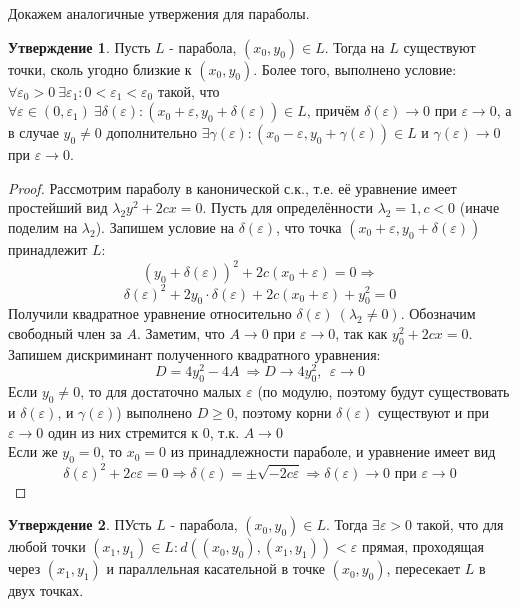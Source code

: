 \documentclass[a4paper, 12pt]{article}
\renewcommand{\epsilon}{\varepsilon}
\theoremstyle{definition}
\newtheorem*{subtheorem}{Утверждение}
\begin{document}
	Докажем аналогичные утвержения для параболы.
	\begin{subtheorem}
		Пусть $L$ - парабола, $(x_0, y_0) \in L$. Тогда на $L$ существуют точки, сколь угодно близкие к $(x_0, y_0)$. Более того, выполнено условие:\\
		$\forall \epsilon_0 > 0 \ \exists \epsilon_1: 0 < \epsilon_1 < \epsilon_0$ такой, что $\forall \epsilon \in (0, \epsilon_1) \ \exists \delta(\epsilon): (x_0 + \epsilon, y_0 + \delta(\epsilon)) \in L$, причём $\delta(\epsilon) \rightarrow 0$ при $\epsilon \rightarrow 0$, а в случае $y_0 \neq 0$ дополнительно $\exists \gamma(\epsilon): (x_0 - \epsilon, y_0 + \gamma(\epsilon)) \in L$ и $\gamma(\epsilon) \rightarrow 0$ при $\epsilon \rightarrow 0$.
	\end{subtheorem}
	\begin{proof}
		Рассмотрим параболу в канонической с.к., т.е. её уравнение имеет простейший вид $\lambda_2y^2+2cx = 0$. Пусть для определённости $\lambda_2 = 1, c < 0$ (иначе поделим на $\lambda_2$). Запишем условие на $\delta(\epsilon)$, что точка $(x_0 + \epsilon, y_0 + \delta(\epsilon))$ принадлежит $L$: $$(y_0 + \delta(\epsilon))^2+2c(x_0 + \epsilon) = 0\Rightarrow$$ $$\delta(\epsilon)^2 + 2y_0\cdot\delta(\epsilon) + 2c(x_0 + \epsilon) + y_0^2 = 0$$
		Получили квадратное уравнение относительно $\delta(\epsilon) \ (\lambda_2 \neq 0)$. Обозначим свободный член за $A$. Заметим, что $A \rightarrow 0$ при $\epsilon \rightarrow 0$, так как $y_0^2+2cx = 0$. Запишем дискриминант полученного квадратного уравнения: $$D = 4y_0^2 - 4A \ \Rightarrow D \rightarrow 4y_0^2, \ \ \epsilon \rightarrow 0$$
		Если $y_0 \neq 0$, то для достаточно малых $\epsilon$ (по модулю, поэтому будут существовать и $\delta(\epsilon)$, и $\gamma(\epsilon)$) выполнено $D \geqslant 0$, поэтому корни $\delta(\epsilon)$ существуют и при $\epsilon \rightarrow 0$ один из них стремится к 0, т.к. $A \rightarrow 0$\\
		Если же $y_0 = 0$, то $x_0 = 0$ из принадлежности параболе, и уравнение имеет вид $$\delta(\epsilon)^2 + 2c\epsilon = 0 \Rightarrow \delta(\epsilon) = \pm\sqrt{-2c\epsilon} \Rightarrow \delta(\epsilon) \rightarrow 0 \text{ при } \epsilon \rightarrow 0$$
	\end{proof}
	\begin{subtheorem}
		ПУсть $L$ - парабола, $(x_0, y_0)\in L$. Тогда $\exists \epsilon > 0$ такой, что для любой точки $(x_1, y_1) \in L: d((x_0, y_0), (x_1, y_1)) < \epsilon$ прямая, проходящая через $(x_1, y_1)$ и параллельная касательной в точке $(x_0, y_0)$, пересекает $L$ в двух точках.
	\end{subtheorem} 
\end{document}
